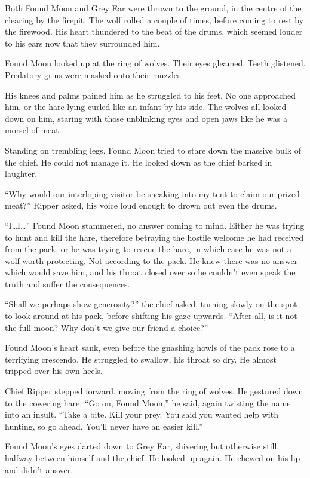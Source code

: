 Both Found Moon and Grey Ear were thrown to the ground, in the centre of the clearing by the firepit. The wolf rolled a couple of times, before coming to rest by the firewood. His heart thundered to the beat of the drums, which seemed louder to his ears now that they surrounded him.

Found Moon looked up at the ring of wolves. Their eyes gleamed. Teeth glistened. Predatory grins were masked onto their muzzles.

His knees and palms pained him as he struggled to his feet. No one approached him, or the hare lying curled like an infant by his side. The wolves all looked down on him, staring with those unblinking eyes and open jaws like he was a morsel of meat.

Standing on trembling legs, Found Moon tried to stare down the massive bulk of the chief. He could not manage it. He looked down as the chief barked in laughter.

``Why would our interloping visitor be sneaking into my tent to claim our prized meat?'' Ripper asked, his voice loud enough to drown out even the drums.

``I\ldots{}I\ldots'' Found Moon stammered, no answer coming to mind. Either he was trying to hunt and kill the hare, therefore betraying the hostile welcome he had received from the pack, or he was trying to rescue the hare, in which case he was not a wolf worth protecting. Not according to the pack. He knew there was no answer which would save him, and his throat closed over so he couldn't even speak the truth and suffer the consequences.

``Shall we perhaps show generosity?'' the chief asked, turning slowly on the spot to look around at his pack, before shifting his gaze upwards. ``After all, is it not the full moon? Why don't we give our friend a choice?''

Found Moon's heart sank, even before the gnashing howls of the pack rose to a terrifying crescendo. He struggled to swallow, his throat so dry. He almost tripped over his own heels.

Chief Ripper stepped forward, moving from the ring of wolves. He gestured down to the cowering hare. ``Go on, Found Moon,'' he said, again twisting the name into an insult. ``Take a bite. Kill your prey. You said you wanted help with hunting, so go ahead. You'll never have an easier kill.''

Found Moon's eyes darted down to Grey Ear, shivering but otherwise still, halfway between himself and the chief. He looked up again. He chewed on his lip and didn't answer.

